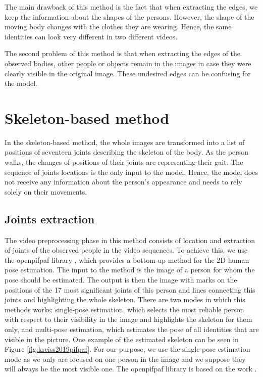 The main drawback of this method is the fact that when extracting the edges, we keep the information about the shapes of the persons. However, the shape of the moving body changes with the clothes they are wearing. Hence, the same identities can look very different in two different videos.

The second problem of this method is that when extracting the edges of the observed bodies, other people or objects remain in the images in case they were clearly visible in the original image. These undesired edges can be confusing for the model.

\section{Skeleton-based method}
In the skeleton-based method, the whole images are transformed into a list of positions of seventeen joints describing the skeleton of the body. As the person walks, the changes of positions of their joints are representing their gait. The sequence of joints locations is the only input to the model. Hence, the model does not receive any information about the person's appearance and needs to rely solely on their movements.

\subsection{Joints extraction}
The video preprocessing phase in this method consists of location and extraction of joints of the observed people in the video sequences. To achieve this, we use the openpifpaf library \cite{openpifpaf}, which provides a bottom-up method for the 2D human pose estimation. The input to the method is the image of a person for whom the pose should be estimated. The output is then the image with marks on the positions of the 17 most significant joints of this person and lines connecting this joints and highlighting the whole skeleton. There are two modes in which this methods works: single-pose estimation, which selects the most reliable person with respect to their visibility in the image and highlights the skeleton for them only, and multi-pose estimation, which estimates the pose of all identities that are visible in the picture. One example of the estimated skeleton can be seen in Figure \ref{fig:kreiss2019pifpaf}. For our purpose, we use the single-pose estimation mode as we only are focused on one person in the image and we suppose they will always be the most visible one. The openpifpaf library is based on the work \cite{kreiss2019pifpaf}.

